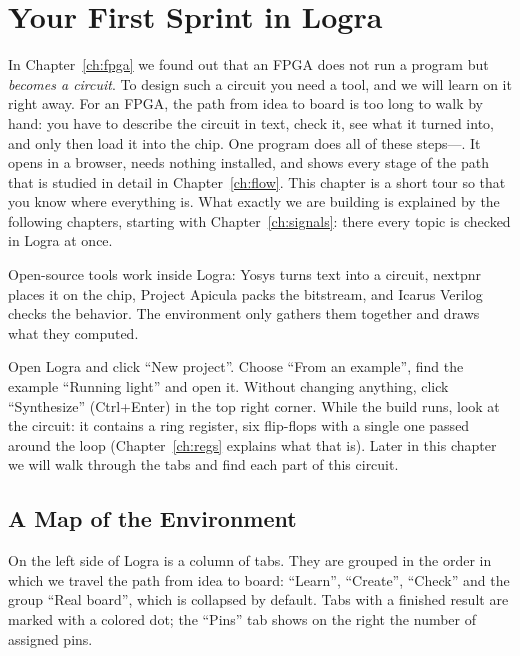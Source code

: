\chapter{Your First Sprint in Logra}
\label{ch:logra}

In Chapter~\ref{ch:fpga} we found out that an FPGA does not run a program but
\emph{becomes a circuit}. To design such a circuit you need a tool, and we will
learn on it right away. For an FPGA, the path from idea to
board is too long to walk by hand: you have to describe the circuit in
text, check it, see what it turned into, and only then
load it into the chip. One program does all of these steps---.
It opens in a browser, needs nothing installed, and shows
every stage of the path that is studied in detail in Chapter~\ref{ch:flow}.
This chapter is a short tour so that you know where everything is. What exactly
we are building is explained by the following chapters, starting with
Chapter~\ref{ch:signals}: there every topic is checked in Logra at once.

Open-source tools work inside Logra: Yosys turns text into a circuit,
nextpnr places it on the chip, Project Apicula packs the bitstream, and
Icarus Verilog checks the behavior. The environment only gathers them together and draws
what they computed.

\begin{buildbox}
Open Logra and click ``New project''. Choose ``From an example'',
find the example ``Running light'' and open it. Without changing anything, click
``Synthesize'' (Ctrl+Enter) in the top right corner. While the build runs, look
at the circuit: it contains a ring register, six flip-flops with a single one
passed around the loop (Chapter~\ref{ch:regs} explains what that is). Later in this chapter we will walk through the tabs and find each part of this circuit.
\end{buildbox}

\section{A Map of the Environment}

On the left side of Logra is a column of tabs. They are grouped in the order in
which we travel the path from idea to board: ``Learn'', ``Create'', ``Check'' and
the group ``Real board'', which is collapsed by default. Tabs with a finished result
are marked with a colored dot; the ``Pins'' tab shows on the right the number of assigned pins.

